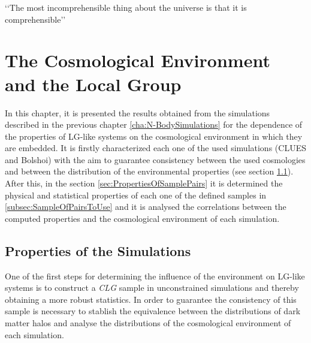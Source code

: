 \begin{savequote}[50mm]
‘‘The most incomprehensible thing about the universe is that it is 
comprehensible’’
\end{savequote}




\chapter{The Cosmological Environment and the Local Group}
\label{cha:Results}


In this chapter, it is presented the results obtained from the simulations 
des\-cribed in the previous chapter \ref{cha:N-BodySimulations} for the 
dependence of the properties of LG-like systems on the cosmological 
environment in which they are embedded. It is firstly characterized each 
one of the used simulations (CLUES and Bolshoi) with the aim to guarantee 
consistency between the used cosmologies and between the distribution of 
the environmental properties (see section 
\ref{sec:StatisticalPropertiesOfAllSimulations}). After this, in the 
section \ref{sec:PropertiesOfSamplePairs} it is determined the physical
and statistical properties of each one of the defined samples in
\ref{subsec:SampleOfPairsToUse} and it is analysed the correlations 
between the computed properties and the cosmological environment of each 
simulation.







\section{Properties of the Simulations}
\label{sec:StatisticalPropertiesOfAllSimulations}


One of the first steps for determining the influence of the 
environment on LG-like systems is to construct a \textit{CLG} sample in
unconstrained simulations and thereby obtaining a more robust statistics.
In order to guarantee the consistency of this sample is necessary to 
stablish the equivalence between the distributions of dark matter halos
and analyse the distributions of the cosmological environment of each 
simulation.



